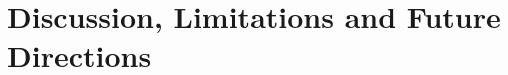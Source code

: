 

\section{Discussion, Limitations and Future Directions}
\label{section:discussion and limitations}






